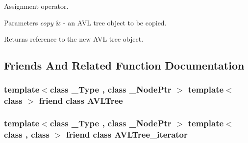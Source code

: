Assignment operator. 


\begin{DoxyParams}{Parameters}
{\em copy} & -\/ an A\+V\+L tree object to be copied. \\
\hline
\end{DoxyParams}
\begin{DoxyReturn}{Returns}
reference to the new A\+V\+L tree object. 
\end{DoxyReturn}


\subsection{Friends And Related Function Documentation}
\hypertarget{class_a_v_l_tree__const__iterator_aa926bd8d1e26ee32ade14a311ebf8df5}{}
\subsubsection[{A\+V\+L\+Tree}]{\setlength{\rightskip}{0pt plus 5cm}template$<$class \+\_\+\+Type , class \+\_\+\+Node\+Ptr $>$ template$<$class $>$ friend class {\bf A\+V\+L\+Tree}\hspace{0.3cm}{\ttfamily [friend]}}\label{class_a_v_l_tree__const__iterator_aa926bd8d1e26ee32ade14a311ebf8df5}
\hypertarget{class_a_v_l_tree__const__iterator_a3b97d3835e767e85b1cededfeefa9d84}{}
\subsubsection[{A\+V\+L\+Tree\+\_\+iterator}]{\setlength{\rightskip}{0pt plus 5cm}template$<$class \+\_\+\+Type , class \+\_\+\+Node\+Ptr $>$ template$<$class , class $>$ friend class {\bf A\+V\+L\+Tree\+\_\+iterator}\hspace{0.3cm}{\ttfamily [friend]}}\label{class_a_v_l_tree__const__iterator_a3b97d3835e767e85b1cededfeefa9d84}
\hypertarget{class_a_v_l_tree__const__iterator_affd846c45384c4c538ae133d9723ffa4}{}
